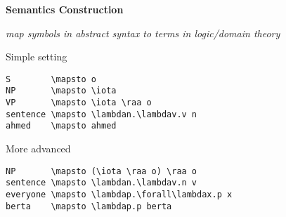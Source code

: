 \textbf{Semantics Construction}

\textit{map symbols in abstract syntax to terms in logic/domain theory}

\vspace{0.5em}
\begin{minipage}[t]{0.4\textwidth}
\parbox[t][1em][t]{\textwidth}{\centering Simple setting}\par
\begin{lstlisting}[language=MMT]
S        \mapsto o
NP       \mapsto \iota
VP       \mapsto \iota \raa o
sentence \mapsto \lambdan.\lambdav.v n
ahmed    \mapsto ahmed
\end{lstlisting}
\end{minipage}
\hspace{1em}
\begin{minipage}[t]{0.5\textwidth}
\parbox[t][1em][t]{\textwidth}{\centering More advanced}\par
\begin{lstlisting}[language=MMT]
NP       \mapsto (\iota \raa o) \raa o
sentence \mapsto \lambdan.\lambdav.n v
everyone \mapsto \lambdap.\forall\lambdax.p x
berta    \mapsto \lambdap.p berta
\end{lstlisting}
\end{minipage}
